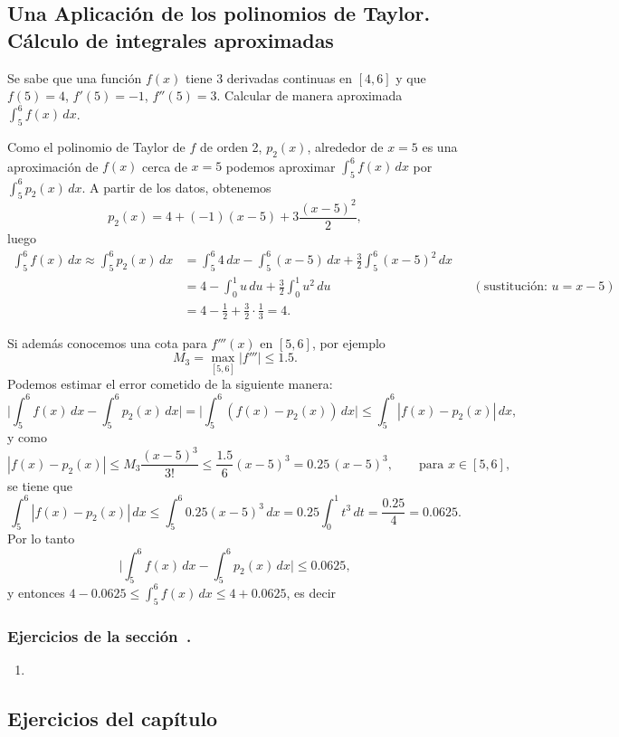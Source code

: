 \subsection{Una Aplicación de los polinomios de Taylor.\\ Cálculo de integrales aproximadas}


\begin{ejemplo}
 Se sabe que una función $f(x)$ tiene 3 derivadas continuas en $[4,6]$ y que $f(5) = 4$, $f'(5) = -1$, $f''(5) = 3$. Calcular de manera aproximada $\int_5^6 f(x) \, dx$.

Como el polinomio de Taylor de $f$ de orden 2, $p_2(x)$, alrededor de $x=5$ es una aproximación de $f(x)$ cerca de $x=5$ podemos aproximar $\int_5^6 f(x)\, dx$ por $\int_5^6 p_2(x)\, dx$.
A partir de los datos, obtenemos
\[
 p_2(x) = 4 + (-1) (x-5) + 3 \frac{(x-5)^2}{2},
\]
luego
\[
\begin{aligned}
 \int_5^6 f(x) \, dx \approx \int_5^6 p_2(x) \, dx &= \int_5^6 4 \, dx - \int_5^6 (x-5) \, dx + \frac32 \int_5^6 (x-5)^2\, dx \\
&= 4 - \int_0^1 u \, du + \frac32 \int_0^1 u^2 \, du & &(\text{sustitución: }u = x-5) \\
&= 4 - \frac12 + \frac32 \cdot \frac13 = 4.
\end{aligned}
\]

Si además conocemos una cota para $f'''(x)$ en $[5,6]$, por ejemplo
\[
 M_3 = \max_{[5,6]} |f'''| \le 1.5.
\]
Podemos estimar el error cometido de la siguiente manera:
\[
 \Big| \int_5^6 f(x)\, dx - \int_5^6 p_2(x) \, dx \Big|
= \Big| \int_5^6 (f(x) - p_2(x)) \, dx \Big|
\le \int_5^6 |f(x) - p_2(x)| \, dx,
\]
y como 
\[
 |f(x) - p_2(x)| \le M_3 \frac{(x-5)^3}{3!} \le \frac{1.5}{6} (x-5)^3 = 0.25 \, (x-5)^3, \qquad\text{para } x \in [5,6],
\]
se tiene que
\[
 \int_5^6 |f(x) - p_2(x)|\, dx \le \int_5^6 0.25 (x-5)^3 \, dx = 0.25 \int_0^1 t^3 \, dt = \frac{0.25}{4} = 0.0625.
\]
Por lo tanto
\[
 \Big| \int_5^6 f(x)\, dx - \int_5^6 p_2(x) \, dx \Big| \le 0.0625,
\]
y entonces $ 4 - 0.0625 \le \int_5^6 f(x) \, dx \le 4 + 0.0625 $, es decir

 






\end{ejemplo}



\subsubsection*{Ejercicios de la sección~.}

\begin{enumerate}
\item 
\end{enumerate}

\subsection*{Ejercicios del capítulo~}



